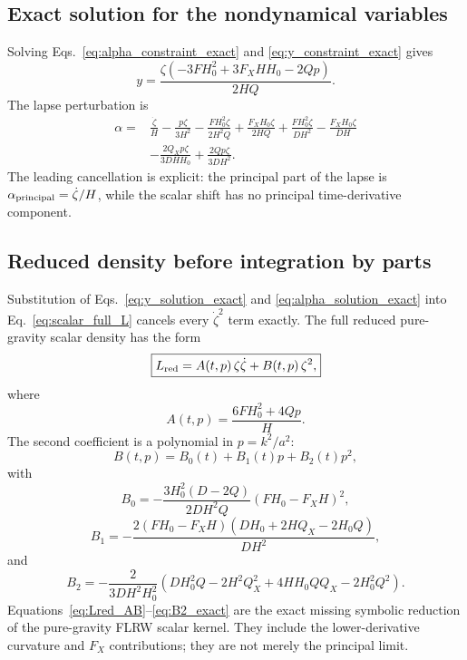 \documentclass[11pt,a4paper]{article}
\newcommand{\Boxed}[1]{\boxed{\displaystyle #1}}
\begin{document}
\subsection{Exact solution for the nondynamical variables}

Solving Eqs.~\eqref{eq:alpha_constraint_exact} and \eqref{eq:y_constraint_exact}
gives
\begin{equation}
\Boxed{
y=
\frac{\zeta\left(-3FH_0^2+3F_XHH_0-2Qp\right)}
{2HQ}.
}
\label{eq:y_solution_exact}
\end{equation}
The lapse perturbation is
\begin{equation}
\boxed{
\begin{aligned}
\alpha={}&
\frac{\dot\zeta}{H}
-\frac{p\zeta}{3H^2}
-\frac{FH_0^2\zeta}{2H^2Q}
+\frac{F_XH_0\zeta}{2HQ}
+\frac{FH_0^2\zeta}{DH^2}
-\frac{F_XH_0\zeta}{DH}
\\
&-\frac{2Q_Xp\zeta}{3DHH_0}
+\frac{2Qp\zeta}{3DH^2}.
\end{aligned}
}
\label{eq:alpha_solution_exact}
\end{equation}
The leading cancellation is explicit: the principal part of the lapse is
\(\alpha_{\rm principal}=\dot\zeta/H\), while the scalar shift has no principal
time-derivative component.

\subsection{Reduced density before integration by parts}

Substitution of Eqs.~\eqref{eq:y_solution_exact} and
\eqref{eq:alpha_solution_exact} into Eq.~\eqref{eq:scalar_full_L} cancels every
\(\dot\zeta^2\) term exactly. The full reduced pure-gravity scalar density has
the form
\begin{equation}
\Boxed{
L_{\rm red}=A(t,p)\,\zeta\dot\zeta+B(t,p)\,\zeta^2,
}
\label{eq:Lred_AB}
\end{equation}
where
\begin{equation}
\Boxed{
A(t,p)=\frac{6FH_0^2+4Qp}{H}.
}
\label{eq:A_exact}
\end{equation}
The second coefficient is a polynomial in \(p=k^2/a^2\):
\begin{equation}
\Boxed{
B(t,p)=B_0(t)+B_1(t)p+B_2(t)p^2,
}
\label{eq:B_poly}
\end{equation}
with
\begin{equation}
\Boxed{
B_0=
-\frac{3H_0^2(D-2Q)}
{2DH^2Q}
\left(FH_0-F_XH\right)^2,
}
\label{eq:B0_exact}
\end{equation}
\begin{equation}
\Boxed{
B_1=
-\frac{2\left(FH_0-F_XH\right)
\left(DH_0+2HQ_X-2H_0Q\right)}
{DH^2},
}
\label{eq:B1_exact}
\end{equation}
and
\begin{equation}
\Boxed{
B_2=
-\frac{2}
{3DH^2H_0^2}
\left(
DH_0^2Q
-2H^2Q_X^2
+4HH_0QQ_X
-2H_0^2Q^2
\right).
}
\label{eq:B2_exact}
\end{equation}
Equations~\eqref{eq:Lred_AB}--\eqref{eq:B2_exact} are the exact missing
symbolic reduction of the pure-gravity FLRW scalar kernel. They include the
lower-derivative curvature and \(F_X\) contributions; they are not merely the
principal limit.
\end{document}
